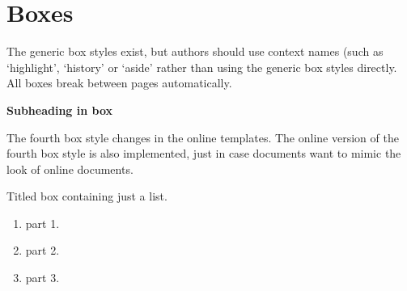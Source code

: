 \documentclass[solutionsatend,twocolumnsolutions]{ouunit}
\begin{document}
\section{Boxes}
The generic box styles exist, but authors should use context names (such as `highlight', `history' or `aside' rather than using the generic box styles directly. All boxes break between pages automatically.
\begin{style1box}
\textbf{Subheading in box}

\lipsum[1]
\end{style1box}
\lipsum[133]
\begin{style2box}
\lipsum[2]
\end{style2box}
\lipsum[133]
\begin{style3box}
\lipsum[3]
\end{style3box}
\lipsum[133]
\begin{style4box}
\lipsum[4]
\end{style4box}
The fourth box style changes in the online templates. The online version of the fourth box style is also implemented, just in case documents want to mimic the look of online documents.
\begin{onlinestyle4box}
\lipsum[4]
\end{onlinestyle4box}
Titled box containing just a list.
\begin{style4box}[Solution]
\begin{enumerate}
\item part 1.
\item part 2.
\item part 3.
\end{enumerate}
\end{style4box}
\end{document}
